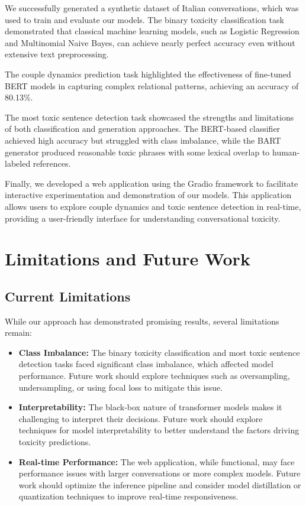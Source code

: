 \documentclass[conference]{IEEEtran}
\begin{document}
We successfully generated a synthetic dataset of Italian conversations, which was used to train and evaluate our models. The binary toxicity classification task demonstrated that classical machine learning models, such as Logistic Regression and Multinomial Naive Bayes, can achieve nearly perfect accuracy even without extensive text preprocessing.

The couple dynamics prediction task highlighted the effectiveness of fine-tuned BERT models in capturing complex relational patterns, achieving an accuracy of 80.13\%.

The most toxic sentence detection task showcased the strengths and limitations of both classification and generation approaches. The BERT-based classifier achieved high accuracy but struggled with class imbalance, while the BART generator produced reasonable toxic phrases with some lexical overlap to human-labeled references.

Finally, we developed a web application using the Gradio framework to facilitate interactive experimentation and demonstration of our models. This application allows users to explore couple dynamics and toxic sentence detection in real-time, providing a user-friendly interface for understanding conversational toxicity.

\section{Limitations and Future Work}

\subsection{Current Limitations}

While our approach has demonstrated promising results, several limitations remain:

\begin{itemize}
    \item \textbf{Class Imbalance:} The binary toxicity classification and most toxic sentence detection tasks faced significant class imbalance, which affected model performance. Future work should explore techniques such as oversampling, undersampling, or using focal loss to mitigate this issue.
    \item \textbf{Interpretability:} The black-box nature of transformer models makes it challenging to interpret their decisions. Future work should explore techniques for model interpretability to better understand the factors driving toxicity predictions.
    \item \textbf{Real-time Performance:} The web application, while functional, may face performance issues with larger conversations or more complex models. Future work should optimize the inference pipeline and consider model distillation or quantization techniques to improve real-time responsiveness.
\end{itemize}
\end{document}
